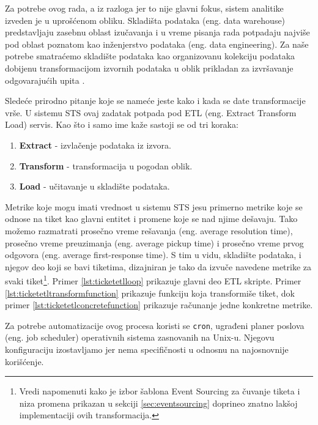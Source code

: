 \documentclass[12pt,oneside]{memoir}
\begin{document}
Za potrebe ovog rada, a iz razloga jer to nije glavni fokus, sistem analitike izveden je u uprošćenom obliku. Skladišta podataka (eng. data warehouse) predstavljaju zasebnu oblast izučavanja i u vreme pisanja rada potpadaju najviše pod oblast poznatom kao inženjerstvo podataka (eng. data engineering). Za naše potrebe smatraćemo skladište podataka kao organizovanu kolekciju podataka dobijenu transformacijom izvornih podataka u oblik prikladan za izvršavanje odgovarajućih upita \cite{dataanalytics}.

Sledeće prirodno pitanje koje se nameće jeste kako i kada se date transformacije vrše. U sistemu STS ovaj zadatak potpada pod ETL (eng. Extract Transform Load) servis. Kao što i samo ime kaže sastoji se od tri koraka:
\begin{enumerate}
    \item \textbf{Extract} - izvlačenje podataka iz izvora.
    \item \textbf{Transform} - transformacija u pogodan oblik.
    \item \textbf{Load} - učitavanje u skladište podataka.
\end{enumerate}

Metrike koje mogu imati vrednost u sistemu STS jesu primerno metrike koje se odnose na tiket kao glavni entitet i promene koje se nad njime dešavaju. Tako možemo razmatrati prosečno vreme rešavanja (eng. average resolution time), prosečno vreme preuzimanja (eng. average pickup time) i prosečno vreme prvog odgovora (eng. average first-response time). S tim u vidu, skladište podataka, i njegov deo koji se bavi tiketima, dizajniran je tako da izvuče navedene metrike za svaki tiket\footnote{Vredi napomenuti kako je izbor šablona Event Sourcing za čuvanje tiketa i niza promena prikazan u sekciji \ref{sec:eventsourcing} doprineo znatno lakšoj implementaciji ovih transformacija.}. Primer \ref{lst:ticketetlloop} prikazuje glavni deo ETL skripte. Primer \ref{lst:ticketetltransformfunction} prikazuje funkciju koja transformiše tiket, dok primer \ref{lst:ticketetlconcretefunction} prikazuje računanje jedne konkretne metrike.

Za potrebe automatizacije ovog procesa koristi se \verb|cron|, ugrađeni planer poslova (eng. job scheduler) operativnih sistema zasnovanih na Unix-u. Njegovu konfiguraciju izostavljamo jer nema specifičnosti u odnosnu na najosnovnije korišćenje.
\end{document}
